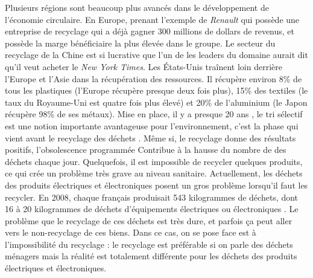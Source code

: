 \smallbreak
Plusieurs régions sont beaucoup plus avancés dans le développement de l'économie circulaire. En Europe, prenant l'exemple de \textit{Renault} qui possède une entreprise de recyclage qui a déjà gagner 300 millions de dollars de revenus, et possède la marge bénéficiaire la plus élevée dans le groupe. Le secteur du recyclage de la Chine est si lucrative que l'un de les leaders du domaine aurait dit qu'il veut acheter le \textit{New York Times}. 
Les États-Unis traînent loin derrière l'Europe et l'Asie dans la récupération des ressources. Il récupère environ 8\% de tous les plastiques (l'Europe récupère presque deux fois plus), 15\% des textiles (le taux du Royaume-Uni est quatre fois plus élevé) et 20\% de l'aluminium (le Japon récupère 98\% de ses métaux).
Mise en place, il y a presque 20 ans , le tri sélectif est une notion importante avantageuse pour l’environnement, c'est la phase qui vient avant le recyclage des déchets \cite{tri}. Même si, le recyclage donne des résultats positifs, l’obsolescence programmée Contribue à la hausse du nombre de des déchets chaque jour. Quelquefois, il est impossible de recycler quelques produits, ce qui crée un problème très grave au niveau sanitaire. 
Actuellement, les déchets des produits électriques et électroniques posent un gros problème lorsqu'il faut les recycler. En 2008, chaque français produisait 543 kilogrammes de déchets, dont 16 à 20 kilogrammes de déchets d’équipements électriques ou électroniques \cite{opSsg}. Le problème que le recyclage de ces déchets est très dure, et parfois ça peut aller vers le non-recyclage de ces biens. Dans ce cas, on se pose face est à l'impossibilité du recyclage : le recyclage est préférable si on parle des déchets ménagers mais la réalité est totalement différente pour les déchets des produits électriques et électroniques. 
